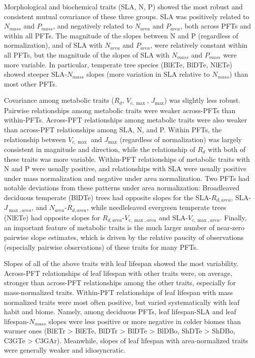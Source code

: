 \documentclass{article}
\begin{document}
Morphological and biochemical traits (SLA, N, P) showed the most robust and consistent mutual covariance of these three groups.
SLA was positively related to $N_{mass}$ and $P_{mass}$, and negatively related to $N_{area}$ and $P_{area}$, both across PFTs and within all PFTs.
The magnitude of the slopes between N and P (regardless of normalization), and of SLA with $N_{area}$ and $P_{area}$, were relatively constant within all PFTs,
but the magnitude of the slopes of SLA with $N_{mass}$ and $P_{mass}$ were more variable.
In particular, temperate tree species (BlETe, BlDTe, NlETe) showed steeper SLA-$N_{mass}$ slopes (more variation in SLA relative to $N_{mass}$) than most other PFTs.

Covariance among metabolic traits ($R_d$, $V_{c,\max}$, $J_{\max}$) was slightly less robust.
Pairwise relationships among metabolic traits were weaker across-PFTs than within-PFTs.
Across-PFT relationships among metabolic traits were also weaker than across-PFT relationships among SLA, N, and P.
Within PFTs, the relationship between $V_{c,\max}$ and $J_{\max}$ (regardless of normalization) was largely consistent in magnitude and direction,
while the relationship of $R_d$ with both of these traits was more variable.
Within-PFT relationships of metabolic traits with N and P were usually positive,
and relationships with SLA were usually positive under mass normalization and negative under area normalization.
Two PFTs had notable deviations from these patterns under area normalization:
Broadleaved deciduous temperate (BlDTe) trees had opposite slopes for the SLA-$R_{d,area}$, SLA-$J_{\max,area}$, and $N_{area}$-$R_{d,area}$,
while needleleaved evergreen temperate trees (NlETe) had opposite slopes for $R_{d,area}$-$V_{c,\max,area}$ and SLA-$V_{c,\max,area}$.
Finally, an important feature of metabolic traits is the much larger number of near-zero pairwise slope estimates,
which is driven by the relative paucity of observations (especially pairwise observations) of these traits for many PFTs.

Slopes of all of the above traits with leaf lifespan showed the most variability.
Across-PFT relationships of leaf lifespan with other traits were, on average, stronger than across-PFT relationships among the other traits, especially for mass-normalized traits.
Within-PFT relationships of leaf lifespan with mass normalized traits were most often positive, but varied systematically with leaf habit and biome.
Namely, among deciduous PFTs, leaf lifespan-SLA and leaf lifespan-$N_{mass}$ slopes were less positive or more negative in colder biomes than warmer ones
(BlETr > BlETe, BlDTr > BlDTe > BlDBo, ShDTe > ShDBo, C3GTe > C3GAr).
Meanwhile, slopes of leaf lifespan with area-normalized traits were generally weaker and idiosyncratic.
\end{document}

